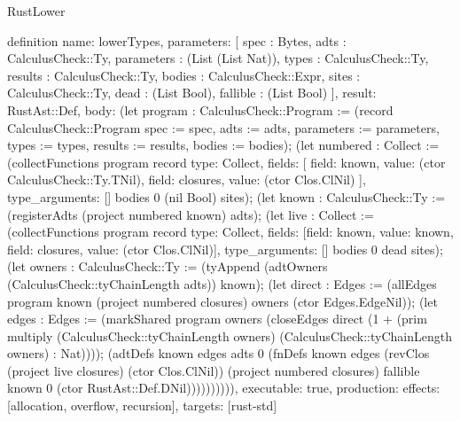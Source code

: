 \begin{lexlean}{RustLower}
\begin{semanticmodule}
definition{
  name: lowerTypes,
  parameters: [
    spec : Bytes,
    adts : CalculusCheck::Ty,
    parameters : (List (List Nat)),
    types : CalculusCheck::Ty,
    results : CalculusCheck::Ty,
    bodies : CalculusCheck::Expr,
    sites : CalculusCheck::Ty,
    dead : (List Bool),
    fallible : (List Bool)
  ],
  result: RustAst::Def,
  body: (let program : CalculusCheck::Program := (record CalculusCheck::Program {spec := spec, adts := adts, parameters := parameters, types := types, results := results, bodies := bodies}); (let numbered : Collect := (collectFunctions program record{
    type: Collect,
    fields: [
      {field: known, value: (ctor CalculusCheck::Ty.TNil)},
      {field: closures, value: (ctor Clos.ClNil)}
    ],
    type_arguments: []
  } bodies 0 (nil Bool) sites); (let known : CalculusCheck::Ty := (registerAdts (project numbered known) adts); (let live : Collect := (collectFunctions program record{
    type: Collect,
    fields: [{field: known, value: known}, {field: closures, value: (ctor Clos.ClNil)}],
    type_arguments: []
  } bodies 0 dead sites); (let owners : CalculusCheck::Ty := (tyAppend (adtOwners (CalculusCheck::tyChainLength adts)) known); (let direct : Edges := (allEdges program known (project numbered closures) owners (ctor Edges.EdgeNil)); (let edges : Edges := (markShared program owners (closeEdges direct (1 + (prim multiply (CalculusCheck::tyChainLength owners) (CalculusCheck::tyChainLength owners) : Nat)))); (adtDefs known edges adts 0 (fnDefs known edges (revClos (project live closures) (ctor Clos.ClNil)) (project numbered closures) fallible known 0 (ctor RustAst::Def.DNil)))))))))),
  executable: true,
  production: {effects: [allocation, overflow, recursion], targets: [rust-std]}
}
\end{semanticmodule}
\end{lexlean}
